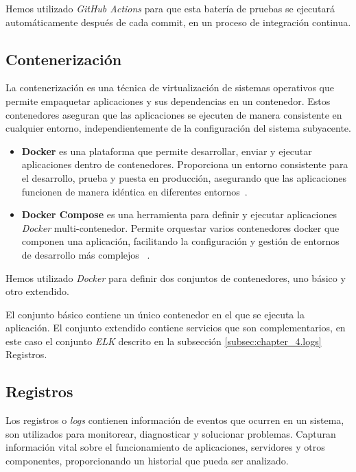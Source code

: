 Hemos utilizado \textit{GitHub Actions} para que esta batería de pruebas se ejecutará automáticamente después de cada
commit, en un proceso de integración continua.

\subsection*{Contenerización}

La contenerización es una técnica de virtualización de sistemas operativos que permite empaquetar aplicaciones y
sus dependencias en un contenedor.
Estos contenedores aseguran que las aplicaciones se ejecuten de manera consistente en cualquier entorno,
independientemente de la configuración del sistema subyacente.

\begin{itemize}
    \item
    \textbf{Docker} es una plataforma que permite desarrollar, enviar y ejecutar aplicaciones dentro de contenedores.
    Proporciona un entorno consistente para el desarrollo, prueba y puesta en producción, asegurando que las
    aplicaciones funcionen de manera idéntica en diferentes entornos~\cite{url_docker}.

    \item
    \textbf{Docker Compose} es una herramienta para definir y ejecutar aplicaciones \textit{Docker} multi-contenedor.
    Permite orquestar varios contenedores docker que componen una aplicación, facilitando la configuración y gestión de
    entornos de desarrollo más complejos ~\cite{url_docker_compose}.
\end{itemize}

Hemos utilizado \textit{Docker} para definir dos conjuntos de contenedores, uno básico y otro extendido.

El conjunto básico contiene un único contenedor en el que se ejecuta la aplicación.
El conjunto extendido contiene servicios que son complementarios, en este caso el conjunto \textit{ELK} descrito en la
subsección \ref{subsec:chapter_4.logs} Registros.

\subsection*{Registros}\label{subsec:chapter_4.logs}

Los registros o \textit{logs} contienen información de eventos que ocurren en un sistema, son utilizados para
monitorear, diagnosticar y solucionar problemas.
Capturan información vital sobre el funcionamiento de aplicaciones, servidores y otros componentes, proporcionando un
historial que pueda ser analizado.

